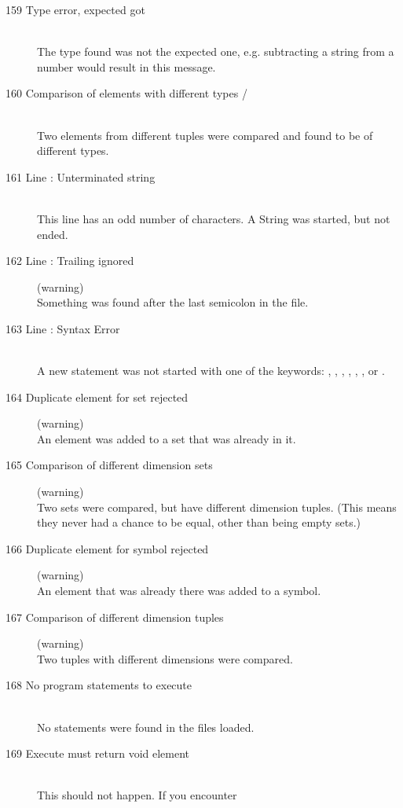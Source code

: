 \begin{description}
%
%  
\item[159 Type error, expected  got ]\ \\
  The type found was not the expected one, e.g. subtracting 
  a string from a number would result in this message.
%
% 
\item[160 Comparison of elements with different types  /
  ]\ \\
  Two elements from different tuples were compared and found to be 
  of different types. 
%
%
\item[161 Line : Unterminated string]\ \\
  This line has an odd number of  characters. 
  A String was started, but not ended.
\item[162 Line : Trailing  ignored] (warning)\ \\
  Something was found after the last semicolon in the file.
\item[163 Line : Syntax Error]\ \\
  A new statement was not started with one of the keywords:
  , , , , 
  , , or .
%
%
\item[164 Duplicate element  for set rejected] (warning)\ \\
   An element was added to a set that was already in it.
\item[165 Comparison of different dimension sets] (warning)\ \\
   Two sets were compared, but have different dimension tuples.
   (This means they never had a chance to
   be equal, other than being empty sets.)
%
%
\item[166 Duplicate element  for symbol  rejected]
   (warning)\ \\
  An element that was already there was added to a symbol.
%
%
\item[167 Comparison of different dimension tuples] (warning)\ \\
  Two tuples with different dimensions were compared.
%
%
\item[168 No program statements to execute]\ \\
  No \zimpl statements were found in the files loaded.
%
%
\item[169 Execute must return void element]\ \\
  This should not happen. If you encounter

\end{description}
